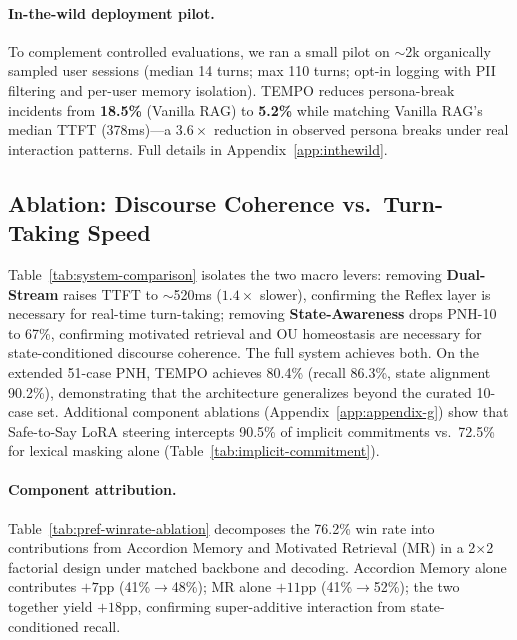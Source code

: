 \documentclass[11pt]{article}
\begin{document}
\paragraph{In-the-wild deployment pilot.}
To complement controlled evaluations, we ran a small pilot on $\sim$2k organically sampled user sessions (median 14 turns; max 110 turns; opt-in logging with PII filtering and per-user memory isolation).
TEMPO reduces persona-break incidents from \textbf{18.5\%} (Vanilla RAG) to \textbf{5.2\%} while matching Vanilla RAG's median TTFT (378ms)---a $3.6\times$ reduction in observed persona breaks under real interaction patterns.
Full details in Appendix~\ref{app:inthewild}.
\subsection{Ablation: Discourse Coherence vs.\ Turn-Taking Speed}
\label{sec:main-results}
Table~\ref{tab:system-comparison} isolates the two macro levers: removing \textbf{Dual-Stream} raises TTFT to $\sim$520ms ($1.4\times$ slower), confirming the Reflex layer is necessary for real-time turn-taking; removing \textbf{State-Awareness} drops PNH-10 to 67\%, confirming motivated retrieval and OU homeostasis are necessary for state-conditioned discourse coherence. The full system achieves both.
On the extended 51-case PNH, TEMPO achieves 80.4\% (recall 86.3\%, state alignment 90.2\%), demonstrating that the architecture generalizes beyond the curated 10-case set.
Additional component ablations (Appendix~\ref{app:appendix-g}) show that Safe-to-Say LoRA steering intercepts 90.5\% of implicit commitments vs.\ 72.5\% for lexical masking alone (Table~\ref{tab:implicit-commitment}).

\paragraph{Component attribution.}
Table~\ref{tab:pref-winrate-ablation} decomposes the 76.2\% win rate into contributions from Accordion Memory and Motivated Retrieval (MR) in a 2$\times$2 factorial design under matched backbone and decoding.
Accordion Memory alone contributes $+7$pp (41\%$\to$48\%); MR alone $+11$pp (41\%$\to$52\%); the two together yield $+18$pp, confirming super-additive interaction from state-conditioned recall.
\end{document}
